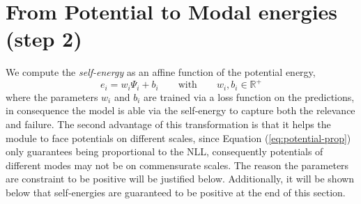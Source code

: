 
\section{From Potential to Modal energies (step 2)}\label{sec:step2}
We compute the \textit{self-energy} as an affine function of the potential energy,
\begin{equation}
e_i = w_i\Psi_i + b_i \qquad \text{with} \qquad w_i, b_i \in \mathbb{R}^+
\label{eq:self-energy}
\end{equation}
where the parameters $w_i$ and $b_i$ are trained via a loss function on the predictions, in consequence the model is able via the self-energy to capture both the relevance and failure. The second advantage of this transformation is that it helps the module to face potentials on different scales, since Equation (\ref{eq:potential-prop}) only guarantees being proportional to the NLL, consequently potentials of different modes may not be on commensurate scales. The reason the parameters are constraint to be positive will be justified below. Additionally, it will be shown below that self-energies are guaranteed to be positive at the end of this section.


